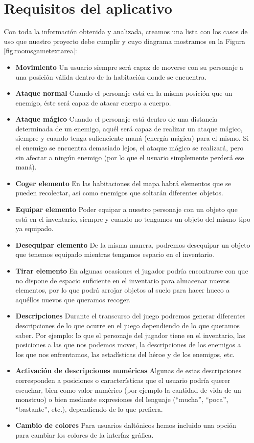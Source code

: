 \section{Requisitos del aplicativo}
Con toda la información obtenida y analizada, creamos una lista con los casos de uso que nuestro proyecto debe cumplir y cuyo diagrama mostramos en la Figura \ref{fig:roomsgametextarea}:

\begin{itemize}
  \item \textbf{Movimiento} Un usuario siempre será capaz de moverse con su personaje a una posición válida dentro de la habitación donde se encuentra. 
  \item \textbf{Ataque normal} Cuando el personaje está en la misma posición que un enemigo, éste será capaz de atacar cuerpo a cuerpo.
  \item \textbf{Ataque mágico} Cuando el personaje está dentro de una distancia determinada de un enemigo, aquél será capaz de realizar un ataque mágico, siempre y cuando tenga sufienciente maná (energía mágica) para el mismo. Si el enemigo se encuentra demasiado lejos, el ataque mágico se realizará, pero sin afectar a ningún enemigo (por lo que el usuario simplemente perderá ese maná).
  \item \textbf{Coger elemento} En las habitaciones del mapa habrá elementos que se pueden recolectar, así como enemigos que soltarán diferentes objetos.
  \item \textbf{Equipar elemento} Poder equipar a nuestro personaje con un objeto que está en el inventario, siempre y cuando no tengamos un objeto del mismo tipo ya equipado.
  \item \textbf{Desequipar elemento} De la misma manera, podremos desequipar un objeto que tenemos equipado mientras tengamos espacio en el inventario.
  \item \textbf{Tirar elemento} En algunas ocasiones el jugador podría encontrarse con que no dispone de espacio suficiente en el inventario para almacenar nuevos elementos, por lo que podrá arrojar objetos al suelo para hacer hueco a aquéllos nuevos que queramos recoger.
  \item \textbf{Descripciones} Durante el transcurso del juego podremos generar diferentes descripciones de lo que ocurre en el juego dependiendo de lo que queramos saber. Por ejemplo: lo que el personaje del jugador tiene en el inventario, las posiciones a las que nos podemos mover, la descripciones de los enemigos a los que nos enfrentamos, las estadísticas del héroe y de los enemigos, etc.
  \item \textbf{Activación de descripciones numéricas} Algunas de estas descripciones corresponden a posiciones o características que el usuario podría querer escuchar, bien como valor numérico (por ejemplo la cantidad de vida de un monstruo) o bien mediante expresiones del lenguaje (``mucha'', ``poca'', ``bastante'', etc.), dependiendo de lo que prefiera.
  \item \textbf{Cambio de colores} Para usuarios daltónicos hemos incluido una opción para cambiar los colores de la interfaz gráfica.
\end{itemize}

